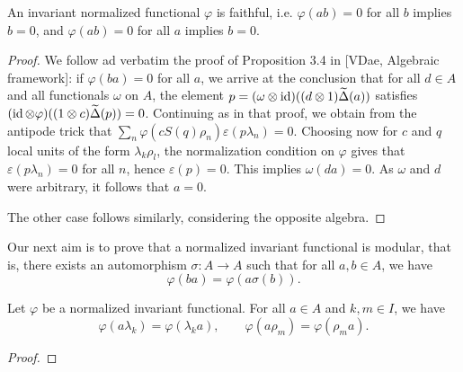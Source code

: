 

\begin{Lem} An invariant normalized functional $\varphi$ is faithful,
  i.e. $\varphi(ab)=0$ for all $b$ implies $b=0$, and $\varphi(ab)=0$
  for all $a$ implies $b=0$.
\end{Lem}

\begin{proof} We follow ad verbatim the proof of Proposition 3.4 in
  [VDae, Algebraic framework]: if $\varphi(ba)=0$ for all $a$, we
  arrive at the conclusion that for all $d\in A$ and all functionals
  $\omega$ on $A$, the element $p = (\omega\otimes \operatorname{id})((d\otimes
  1)\widetilde{\Delta}(a))$ satisfies $(\operatorname{id}\otimes \varphi)((1\otimes
  c)\widetilde{\Delta}(p)) = 0$. Continuing as in that proof, we obtain from the
  antipode trick that $\sum_n
  \varphi(cS(q)\rho_n)\varepsilon(p\lambda_n)=0$. Choosing now for $c$
  and $q$ local units of the form $\lambda_k\rho_l$, the normalization
  condition on $\varphi$ gives that $\varepsilon(p\lambda_n)=0$ for
  all $n$, hence $\varepsilon(p)=0$. This implies $\omega(da)=0$. As
  $\omega$ and $d$ were arbitrary, it follows that $a=0$.

The other case follows similarly, considering the opposite algebra.
\end{proof}

Our next aim is to prove that a normalized invariant functional is
modular, that is, there exists an automorphism $\sigma: A\rightarrow
A$ such that for all $a,b\in A$, we have \[\varphi(ba) =
\varphi(a\sigma(b)).\]

\begin{Lem} Let $\varphi$ be a normalized invariant functional. For
  all $a\in A$ and $k,m\in I$, we have \[\varphi(a\lambda_k) =
  \varphi(\lambda_ka),\qquad \varphi(a\rho_m) = \varphi(\rho_ma).\]
\end{Lem}

\begin{proof}

\end{proof}


